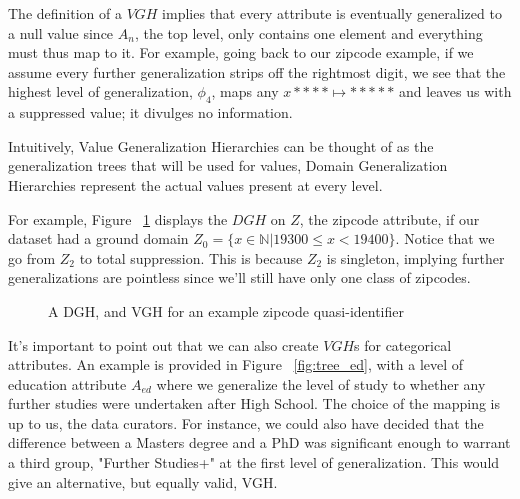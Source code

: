 The definition of a $VGH$ implies that every attribute is eventually generalized to a null value since $A_n$, the top level, only contains one element and everything must thus map to it. For example, going back to our zipcode example, if we assume every further generalization strips off the rightmost digit, we see that the highest level of generalization, $\phi_4$, maps any $x**** \mapsto *****$ and leaves us with a suppressed value; it divulges no information.

Intuitively, Value Generalization Hierarchies can be thought of as the generalization trees that will be used for values, Domain Generalization Hierarchies represent the actual values present at every level.

For example, Figure ~\ref{fig:tree_zip} displays the $DGH$ on $Z$, the zipcode attribute, if our dataset had a ground domain $Z_0 = \{x \in \mathbb{N} | 19300 \leq x < 19400 \}$. Notice that we go from $Z_2$ to total suppression. This is because $Z_2$ is singleton, implying further generalizations are pointless since we'll still have only one class of zipcodes.

\begin{figure}
\centering
\subfigure[$DGH_Z$]{
    \begin{tikzpicture}[sibling distance=6em,
    level 2/.style={sibling distance=10em},
    level 3/.style={sibling distance=5em}]]
    \node {$Z_3 = \{*****\}$}
    child {node {$Z_2 = \{193**\}$}
    child {node {$Z_1 = \{193 \mspace{2mu}x* | x \in [0,1,...,9]    \}$}
    child {node {$Z_0 = \{x \in \mathbb{N} | 19300 \leq x < 19400 \}$}
    }}};
    \end{tikzpicture}}
\subfigure[$VGH_{Z}$]{
    \begin{tikzpicture}[sibling distance=6em,
    level 2/.style={sibling distance=10em},
    level 3/.style={sibling distance=5em}]]
    \node {$*****$}
    child { node {$193**$} 
        child { node {$1936*$}
            child { node {$19362$}}
            child { node {$19360$}}
        }
        child { node {$1933*$}
            child { node {$19332$}}
            child { node {$19334$}}
        }
    };
    \end{tikzpicture}}
\caption{A DGH, and VGH for an example zipcode quasi-identifier}
\label{fig:tree_zip}
\end{figure}

It's important to point out that we can also create $VGH$s for categorical attributes. An example is provided in Figure ~\ref{fig:tree_ed}, with a level of education attribute $A_{ed}$ where we generalize the level of study to whether any further studies were undertaken after High School. The choice of the mapping is up to us, the data curators. For instance, we could also have decided that the difference between a Masters degree and a PhD was significant enough to warrant a third group, "Further Studies+" at the first level of generalization. This would give an alternative, but equally valid, VGH.

